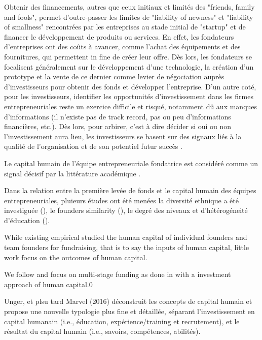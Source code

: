 \documentclass[11pt]{article}
\begin{document}
Obtenir des financements, autres que ceux initiaux et limités des "friends, family and fools", permet d'outre-passer les limites de "liability of newness" et "liability of smallness" rencontrées par les entreprises au stade initial de "startup" et de financer le développement de produits ou services. En effet, les fondateurs d'entreprises ont des coûts à avancer, comme l'achat des équipements et des fournitures, qui permettent in fine de créer leur offre. Dès lors, les fondateurs se focalisent généralement sur le développement d'une technologie, la création d'un prototype et la vente de ce dernier comme levier de négociation auprès d'investisseurs pour obtenir des fonds et développer l'entreprise. D'un autre coté, pour les investisseurs, identifier les opportunités d'investissement dans les firmes entrepreneuriales reste un exercice difficile et risqué, notamment dû aux manques d'informations (il n'existe pas de track record, pas ou peu d'informations financières, etc.). Dès lors, pour arbirer, c'est à dire décider si oui ou non l'investissement aura lieu, les investisseurs se basent sur des signaux liés à la qualité de l'organisation et de son potentiel futur succès \citep{plummer2016better}.

Le capital humain de l'équipe entrepreneuriale fondatrice est considéré comme un signal décisif par la littérature académique \citet{ko2018signaling}.

Dans la relation entre la première levée de fonds et le capital humain des équipes entrepreneuriales, pluieurs études ont été menées la diversité ethnique a été investiguée (\citet{wise2022startup}), le founders similarity (\citet{singhal2022data}), le degré des niveaux et d'hétérogéneité d'éducation (\citet{pinelli2020too}).

While existing empirical studied the human capital of individual founders and team founders for fundraising, that is to say the inputs of human capital, little work focus on the outcomes of human capital.

We follow \citet{reese2020should} and focus on multi-stage funding as done in \citet{ko2018signaling} with a investment approach of human capital.0

Unger, et plsu tard Marvel (2016) déconstruit les concepts de capital humain et propose une nouvelle typologie plus fine et détaillée, séparant l'investissement en capital humanain (i.e., éducation, expérience/training et recrutement), et le résultat du capital humain (i.e., savoirs, compétences, abilités).
\end{document}
